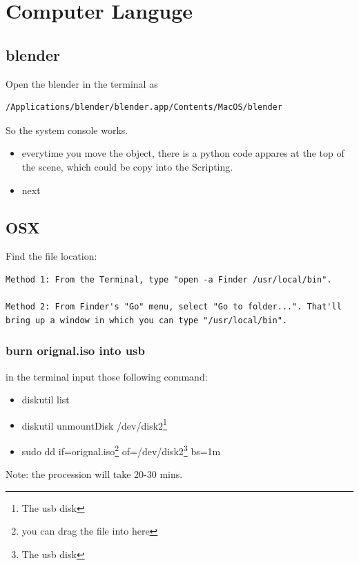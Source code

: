 \chapter{Computer Languge}

\label{ch:Computer Languge}

\section{blender}

Open the blender in the terminal as 
\begin{verbatim}
/Applications/blender/blender.app/Contents/MacOS/blender
\end{verbatim}
So the system console works.

\begin{itemize}
\item everytime you move the object, there is a python code appares at the top of the scene, which could be copy into the Scripting.
\item  next
\end{itemize}


\section{OSX}

Find the file location:
\begin{verbatim}
Method 1: From the Terminal, type "open -a Finder /usr/local/bin".

Method 2: From Finder's "Go" menu, select "Go to folder...". That'll bring up a window in which you can type "/usr/local/bin".
\end{verbatim}

\subsection{burn orignal.iso into usb}

in the terminal input those following command:

\begin{itemize}
\item diskutil list
\item diskutil unmountDisk /dev/disk2\footnote{The usb disk}   
\item sudo dd if=orignal.iso\footnote{you can drag the file into here} of=/dev/disk2\footnote{The usb disk} bs=1m
\end{itemize}

Note:
the procession will take 20-30 mins.

